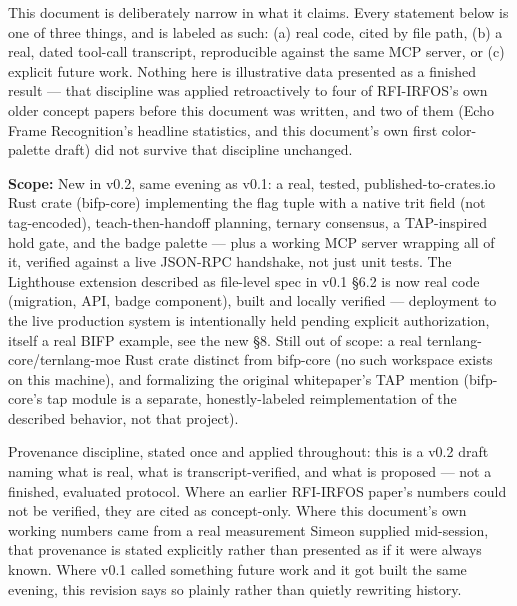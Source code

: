 \documentclass[11pt,a4paper]{article}
\begin{document}
This document is deliberately narrow in what it claims. Every statement below is one of three things, and is labeled as such: (a) real code, cited by file path, (b) a real, dated tool-call transcript, reproducible against the same MCP server, or (c) explicit future work. Nothing here is illustrative data presented as a finished result — that discipline was applied retroactively to four of RFI-IRFOS's own older concept papers before this document was written, and two of them (Echo Frame Recognition's headline statistics, and this document's own first color-palette draft) did not survive that discipline unchanged.

\vspace{6pt}\begin{tcolorbox}[findingbox]
\textbf{\color{rfi-white}Scope:} New in v0.2, same evening as v0.1: a real, tested, published-to-crates.io Rust crate (bifp-core) implementing the flag tuple with a native trit field (not tag-encoded), teach-then-handoff planning, ternary consensus, a TAP-inspired hold gate, and the badge palette — plus a working MCP server wrapping all of it, verified against a live JSON-RPC handshake, not just unit tests. The Lighthouse extension described as file-level spec in v0.1 §6.2 is now real code (migration, API, badge component), built and locally verified — deployment to the live production system is intentionally held pending explicit authorization, itself a real BIFP example, see the new §8. Still out of scope: a real ternlang-core/ternlang-moe Rust crate distinct from bifp-core (no such workspace exists on this machine), and formalizing the original whitepaper's TAP mention (bifp-core's tap module is a separate, honestly-labeled reimplementation of the described behavior, not that project).
\end{tcolorbox}\vspace{6pt}
\vspace{6pt}\begin{tcolorbox}[winbox, title=Disposition]
Provenance discipline, stated once and applied throughout: this is a v0.2 draft naming what is real, what is transcript-verified, and what is proposed — not a finished, evaluated protocol. Where an earlier RFI-IRFOS paper's numbers could not be verified, they are cited as concept-only. Where this document's own working numbers came from a real measurement Simeon supplied mid-session, that provenance is stated explicitly rather than presented as if it were always known. Where v0.1 called something future work and it got built the same evening, this revision says so plainly rather than quietly rewriting history.
\end{tcolorbox}\vspace{6pt}
\newpage
\end{document}
